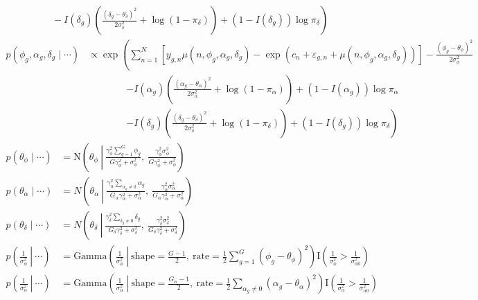 \documentclass{article}\usepackage{graphicx, color}
\providecommand{\e}{\varepsilon}
\begin{document}
\begin{flushleft}
\begin{align*}
&\left .  \qquad - I(\delta_g) \left ( \frac{(\delta_g - \theta_\delta)^2}{2 \sigma_\delta^2} + \log( 1 - \pi_\delta) \right ) + (1 - I(\delta_g)) \log \pi_\delta  \right ) 
\end{align*}
\begin{align*}
p(\phi_g, \alpha_g, \delta_g \mid \cdots)  &\propto  \exp \left (\sum_{n = 1}^N \left [y_{g, n} \mu(n, \phi_g, \alpha_g, \delta_g)  - \exp (c_n + \e_{g, n} + \mu(n, \phi_g, \alpha_g, \delta_g)) \right ] - \frac{(\phi_g - \theta_\phi)^2}{2 \sigma_\phi^2} \right . \\
& \qquad \qquad \left . - I(\alpha_g) \left ( \frac{(\alpha_g - \theta_\alpha)^2}{2 \sigma_\alpha^2} + \log( 1 - \pi_\alpha) \right ) + (1 - I(\alpha_g)) \log \pi_\alpha  \right . \\
& \qquad \qquad \left . - I(\delta_g) \left ( \frac{(\delta_g - \theta_\delta)^2}{2 \sigma_\delta^2} + \log( 1 - \pi_\delta) \right ) + (1 - I(\delta_g)) \log \pi_\delta  \right )
\end{align*}
\begin{align*}
p(\theta_\phi \mid \cdots) &= \text{N} \left (\theta_\phi \ \left \lvert  \ \frac{ \gamma_\phi^2 \sum_{g = 1}^G \phi_g}{G \gamma_\phi^2 + \sigma_\phi^2} \right ., \ \frac{\gamma_\phi^2 \sigma_\phi^2}{G\gamma_\phi^2 + \sigma_\phi^2} \right ) \\
p(\theta_\alpha \mid \cdots) &= N \left (\theta_\alpha \ \left \lvert \ \frac{\gamma_\alpha^2 \sum_{\alpha_g \ne 0} \alpha_g}{G_\alpha \gamma_\alpha^2 + \sigma_\alpha^2} \right ., \ \frac{\gamma_\alpha^2 \sigma_\alpha^2}{G_\alpha \gamma_\alpha^2 + \sigma_\alpha^2} \right ) \\
p(\theta_\delta \mid \cdots) &= N \left ( \theta_\delta \ \left \lvert \ \frac{\gamma_\delta^2 \sum_{\delta_g \ne 0} \delta_g}{G_\delta \gamma_\delta^2 + \sigma_\delta^2} \right . , \ \frac{\gamma_\delta^2 \sigma_\delta^2}{G_\delta \gamma_\delta^2 + \sigma_\delta^2} \right ) \\
p \left ( \left . \frac{1}{\sigma_\phi^2}  \ \right \rvert \ \cdots \right ) &= \text{Gamma} \left ( \left . \frac{1}{\sigma_\phi^2} \ \right \rvert \ \text{shape} = \frac{G - 1}{2}, \ \text{rate} =  \frac{1}{2} \sum_{g = 1}^G (\phi_g - \theta_\phi)^2  \right )   \text{I} \left (\frac{1}{\sigma_\phi^2} >\frac{1}{ \sigma_{\phi 0}^2} \right ) \\
p \left ( \left . \frac{1}{\sigma_\alpha^2}  \ \right \rvert \ \cdots \right ) &= \text{Gamma} \left ( \left . \frac{1}{\sigma_\alpha^2} \ \right \rvert  \ \text{shape} = \frac{G_\alpha - 1}{2}, \ \text{rate} = \frac{1}{2} \sum_{\alpha_g \ne 0} (\alpha_g - \theta_\alpha)^2 \right )  \text{I} \left (\frac{1}{\sigma_\alpha^2} >\frac{1}{ \sigma_{\alpha 0}^2} \right )\\

\end{align*}
\end{flushleft}
\end{document}
